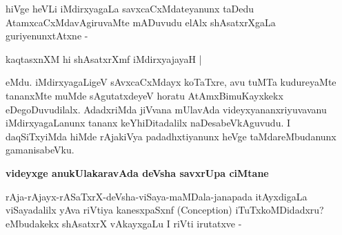 \noindent
hiVge heVLi iMdirxyagaLa savxcaCxMdateyanunx taDedu AtamxcaCxMdavAgiruvaMte mADuvudu elAlx shAsatxrX\-gaLa guriyenunxtAtxne -

\begin{shloka}
kaqtasxnXM hi shAsatxrXmf iMdirxyajayaH |\label{96}
\end{shloka}

\noindent
eMdu. iMdirxyagaLigeV sAvxcaCxMdayx koTaTxre, avu tuMTa kudureyaMte tananxMte muMde sAgutatx\-deyeV horatu AtAmxBimuKayxkekx eDegoDuvudilalx. AdadxriMda jiVvana mUlavAda videyxyananxriyu\-vavanu iMdirxyagaLanunx tananx keYhiDitadalilx naDesabeVkAguvudu. I daqSiTxyiMda hiMde rAjakiVya padadhxti\-yanunx heVge taMdareMbudanunx gamanisabeVku.

{\bigskip
\noindent
{\large\bf videyxge anukUlakaravAda deVsha savxrUpa ciMtane}}
\medskip

\noindent
rAja-rAjayx-rASaTxrX-deVsha-viSaya-maMDala-janapada itAyxdigaLa viSayadalilx yAva riVtiya kanesx\-paSxnf ({\rm Conception}) iTuTxkoMDidadxru? eMbudakekx shAsatxrX vAkayxgaLu I riVti irutatxve -

